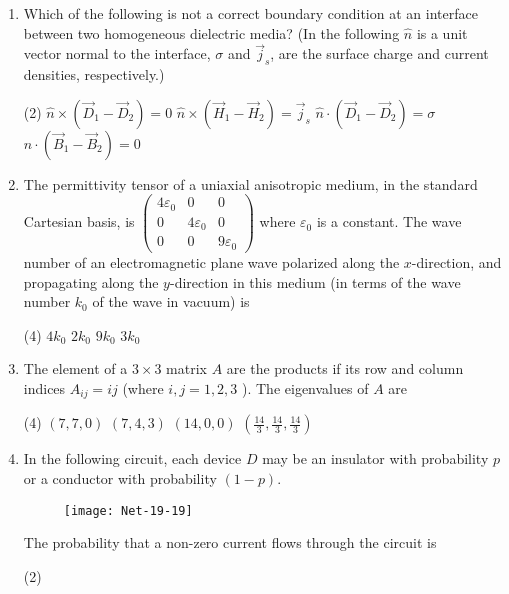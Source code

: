 \begin{enumerate}
\begin{tasks}
\end{tasks}
\item  Which of the following is not a correct boundary condition at an interface between two homogeneous dielectric media? (In the following $\hat{n}$ is a unit vector normal to the interface, $\sigma$ and $\vec{j}_{s}$, are the surface charge and current densities, respectively.)
 \begin{tasks}(2)
	\task[\textbf{a.}]$\hat{n} \times\left(\vec{D}_{1}-\vec{D}_{2}\right)=0$
	\task[\textbf{b.}] $\hat{n} \times\left(\vec{H}_{1}-\vec{H}_{2}\right)=\vec{j}_{s}$
	\task[\textbf{c.}]$\hat{n} \cdot\left(\vec{D}_{1}-\vec{D}_{2}\right)=\sigma$
	\task[\textbf{d.}]  $\hat{n} \cdot\left(\vec{B}_{1}-\vec{B}_{2}\right)=0$
\end{tasks}
\item The permittivity tensor of a uniaxial anisotropic medium, in the standard Cartesian basis, is $\left(\begin{array}{ccc}4 \varepsilon_{0} & 0 & 0 \\ 0 & 4 \varepsilon_{0} & 0 \\ 0 & 0 & 9 \varepsilon_{0}\end{array}\right)$ where $\varepsilon_{0}$ is a constant. The wave number of an electromagnetic plane wave polarized along the $x$-direction, and propagating along the $y$-direction in this medium (in terms of the wave number $k_{0}$ of the wave in vacuum) is
 \begin{tasks}(4)
	\task[\textbf{a.}] $4 k_{0}$
	\task[\textbf{b.}]$2 k_{0}$
	\task[\textbf{c.}] $9 k_{0}$
	\task[\textbf{d.}] $3 k_{0}$
\end{tasks}
\item  The element of a $3 \times 3$ matrix $A$ are the products if its row and column indices $A_{i j}=i j$ (where $i, j=1,2,3$ ). The eigenvalues of $A$ are
 \begin{tasks}(4)
	\task[\textbf{a.}]$(7,7,0)$
	\task[\textbf{b.}]$(7,4,3)$
	\task[\textbf{c.}]$(14,0,0)$
	\task[\textbf{d.}] $\left(\frac{14}{3}, \frac{14}{3}, \frac{14}{3}\right)$
\end{tasks}
\item In the following circuit, each device $D$ may be an insulator with probability $p$ or a conductor with probability $(1-p)$.
\begin{figure}[H]
	\centering
	\texttt{[image: Net-19-19]}
\end{figure}
The probability that a non-zero current flows through the circuit is
 \begin{tasks}(2)

\end{tasks}
\end{enumerate}
